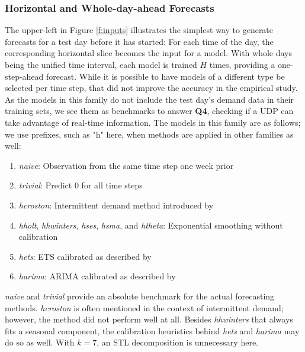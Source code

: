 \subsubsection{Horizontal and Whole-day-ahead Forecasts}
\label{hori}

The upper-left in Figure \ref{f:inputs} illustrates the simplest way to
    generate forecasts for a test day before it has started:
For each time of the day, the corresponding horizontal slice becomes the input
    for a model.
With whole days being the unified time interval, each model is trained $H$
    times, providing a one-step-ahead forecast.
While it is possible to have models of a different type be selected per time
    step, that did not improve the accuracy in the empirical study.
As the models in this family do not include the test day's demand data in
    their training sets, we see them as benchmarks to answer \textbf{Q4},
    checking if a UDP can take advantage of real-time information.
The models in this family are as follows; we use prefixes, such as "h" here,
    when methods are applied in other families as well:
\begin{enumerate}
\item \textit{naive}:
          Observation from the same time step one week prior
\item \textit{trivial}:
          Predict $0$ for all time steps
\item \textit{hcroston}:
          Intermittent demand method introduced by \cite{croston1972}
\item \textit{hholt},
      \textit{hhwinters},
      \textit{hses},
      \textit{hsma}, and
      \textit{htheta}:
          Exponential smoothing without calibration
\item \textit{hets}:
          ETS calibrated as described by \cite{hyndman2008b}
\item \textit{harima}:
          ARIMA calibrated as described by \cite{hyndman2008a}
\end{enumerate}
\textit{naive} and \textit{trivial} provide an absolute benchmark for the
    actual forecasting methods.
\textit{hcroston} is often mentioned in the context of intermittent demand;
    however, the method did not perform well at all.
Besides \textit{hhwinters} that always fits a seasonal component, the
    calibration heuristics behind \textit{hets} and \textit{harima} may do so
    as well.
With $k=7$, an STL decomposition is unnecessary here.
